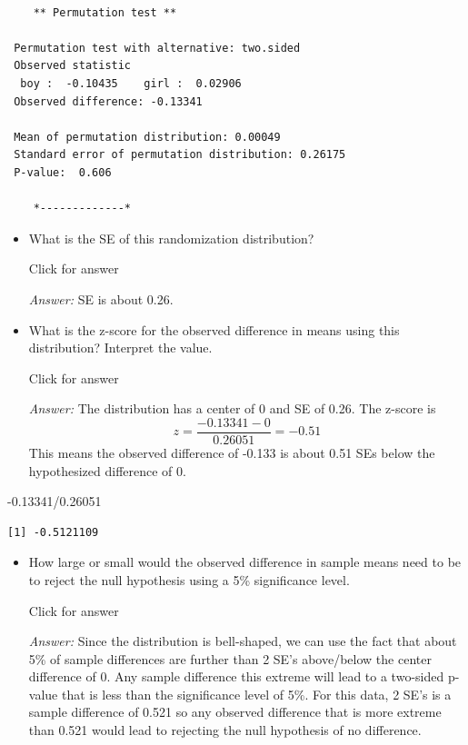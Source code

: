 \documentclass[
]{book}
\newenvironment{Shaded}{\begin{snugshade}}{\end{snugshade}}
\newcommand{\FloatTok}[1]{\textcolor[rgb]{0.00,0.00,0.81}{#1}}
\newcommand{\SpecialCharTok}[1]{\textcolor[rgb]{0.00,0.00,0.00}{#1}}
\providecommand{\tightlist}{%
  \setlength{\itemsep}{0pt}\setlength{\parskip}{0pt}}
\begin{document}
\begin{verbatim}

    ** Permutation test **

 Permutation test with alternative: two.sided 
 Observed statistic
  boy :  -0.10435    girl :  0.02906 
 Observed difference: -0.13341 

 Mean of permutation distribution: 0.00049 
 Standard error of permutation distribution: 0.26175 
 P-value:  0.606 

    *-------------*
\end{verbatim}

\begin{itemize}
\tightlist
\item
  What is the SE of this randomization distribution?

  Click for answer

  \emph{Answer:} SE is about 0.26.
\end{itemize}

\begin{itemize}
\tightlist
\item
  What is the z-score for the observed difference in means using this distribution? Interpret the value.
  \vspace*{.5in}

  Click for answer

  \emph{Answer:} The distribution has a center of 0 and SE of 0.26. The z-score is
  \[
  z = \dfrac{-0.13341 - 0}{0.26051} = -0.51
  \]
  This means the observed difference of -0.133 is about 0.51 SEs below the hypothesized difference of 0.
\end{itemize}

\begin{Shaded}
\begin{Highlighting}[]
\SpecialCharTok{{-}}\FloatTok{0.13341}\SpecialCharTok{/}\FloatTok{0.26051} 
\end{Highlighting}
\end{Shaded}

\begin{verbatim}
[1] -0.5121109
\end{verbatim}

\begin{itemize}
\tightlist
\item
  How large or small would the observed difference in sample means need to be to reject the null hypothesis using a 5\% significance level.

  Click for answer

  \emph{Answer:} Since the distribution is bell-shaped, we can use the fact that about 5\% of sample differences are further than 2 SE's above/below the center difference of 0. Any sample difference this extreme will lead to a two-sided p-value that is less than the significance level of 5\%. For this data, 2 SE's is a sample difference of 0.521 so any observed difference that is more extreme than 0.521 would lead to rejecting the null hypothesis of no difference.
\end{itemize}
\end{document}

